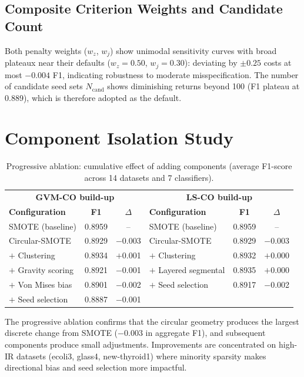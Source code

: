 \subsection{Composite Criterion Weights and Candidate Count}

Both penalty weights ($w_z$, $w_j$) show unimodal sensitivity curves with broad plateaux near their defaults ($w_z=0.50$, $w_j=0.30$): deviating by $\pm 0.25$ costs at most $-0.004$ F1, indicating robustness to moderate misspecification.
The number of candidate seed sets $N_\mathrm{cand}$ shows diminishing returns beyond 100 (F1 plateau at 0.889), which is therefore adopted as the default.


\section{Component Isolation Study}
\label{sec:abl:components}

\begin{table}[H]
\centering
\caption{Progressive ablation: cumulative effect of adding components (average F1-score across 14 datasets and 7 classifiers).}
\label{tab:abl:progressive}
\begin{tabular}{lcc|lcc}
\toprule
\multicolumn{3}{c|}{\textbf{GVM-CO build-up}} & \multicolumn{3}{c}{\textbf{LS-CO build-up}} \\
\textbf{Configuration} & \textbf{F1} & \textbf{$\Delta$} & \textbf{Configuration} & \textbf{F1} & \textbf{$\Delta$} \\
\midrule
SMOTE (baseline)       & 0.8959 & -- & SMOTE (baseline)      & 0.8959 & -- \\
Circular-SMOTE         & 0.8929 & $-$0.003 & Circular-SMOTE        & 0.8929 & $-$0.003 \\
$+$ Clustering         & 0.8934 & $+$0.001 & $+$ Clustering        & 0.8932 & $+$0.000 \\
$+$ Gravity scoring    & 0.8921 & $-$0.001 & $+$ Layered segmental & 0.8935 & $+$0.000 \\
$+$ Von Mises bias     & 0.8901 & $-$0.002 & $+$ Seed selection    & 0.8917 & $-$0.002 \\
$+$ Seed selection     & 0.8887 & $-$0.001 & & & \\
\bottomrule
\end{tabular}
\end{table}

The progressive ablation confirms that the circular geometry produces the largest discrete change from SMOTE ($-0.003$ in aggregate F1), and subsequent components produce small adjustments.
Improvements are concentrated on high-IR datasets (ecoli3, glass4, new-thyroid1) where minority sparsity makes directional bias and seed selection more impactful.

